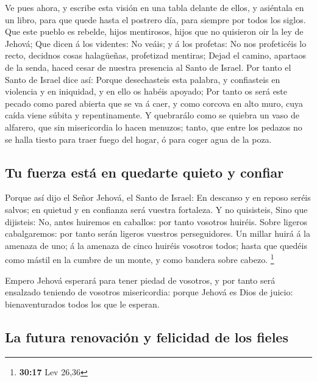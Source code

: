  Ve pues ahora, y escribe esta visión en una tabla delante
de ellos, y asiéntala en un libro, para que quede hasta el postrero día,
para siempre por todos los siglos.  Que este pueblo es
rebelde, hijos mentirosos, hijos que no quisieron oir la ley de Jehová;
 Que dicen á los videntes: No veáis; y á los profetas: No
nos profeticéis lo recto, decidnos cosas halagüeñas, profetizad
mentiras;  Dejad el camino, apartaos de la senda, haced
cesar de nuestra presencia al Santo de Israel.  Por tanto
el Santo de Israel dice así: Porque desechasteis esta palabra, y
confiasteis en violencia y en iniquidad, y en ello os habéis apoyado;
 Por tanto os será este pecado como pared abierta que se
va á caer, y como corcova en alto muro, cuya caída viene súbita y
repentinamente.  Y quebrarálo como se quiebra un vaso de
alfarero, que sin misericordia lo hacen menuzos; tanto, que entre los
pedazos no se halla tiesto para traer fuego del hogar, ó para coger agua
de la poza.

\hypertarget{tu-fuerza-estuxe1-en-quedarte-quieto-y-confiar}{%
\subsection{Tu fuerza está en quedarte quieto y
confiar}\label{tu-fuerza-estuxe1-en-quedarte-quieto-y-confiar}}

 Porque así dijo el Señor Jehová, el Santo de Israel: En
descanso y en reposo seréis salvos; en quietud y en confianza será
vuestra fortaleza. Y no quisisteis,  Sino que dijisteis:
No, antes huiremos en caballos: por tanto vosotros huiréis. Sobre
ligeros cabalgaremos: por tanto serán ligeros vuestros perseguidores.
 Un millar huirá á la amenaza de uno; á la amenaza de
cinco huiréis vosotros todos; hasta que quedéis como mástil en la cumbre
de un monte, y como bandera sobre cabezo. \footnote{\textbf{30:17} Lev
  26,36}

 Empero Jehová esperará para tener piedad de vosotros, y
por tanto será ensalzado teniendo de vosotros misericordia: porque
Jehová es Dios de juicio: bienaventurados todos los que le esperan.

\hypertarget{la-futura-renovaciuxf3n-y-felicidad-de-los-fieles}{%
\subsection{La futura renovación y felicidad de los
fieles}\label{la-futura-renovaciuxf3n-y-felicidad-de-los-fieles}}

